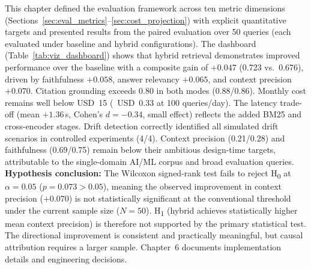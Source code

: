 \medskip
\noindent This chapter defined the evaluation framework across ten metric dimensions (Sections~\ref{sec:eval_metrics}--\ref{sec:cost_projection}) with explicit quantitative targets and presented results from the paired evaluation over 50 queries (each evaluated under baseline and hybrid configurations). The dashboard (Table~\ref{tab:viz_dashboard}) shows that hybrid retrieval demonstrates improved performance over the baseline with a composite gain of $+0.047$ (0.723 vs.\ 0.676), driven by faithfulness $+0.058$, answer relevancy $+0.065$, and context precision $+0.070$. Citation grounding exceeds 0.80 in both modes (0.88/0.86). Monthly cost remains well below USD~15 (~USD~0.33 at 100 queries/day). The latency trade-off (mean $+1.36$\,s, Cohen's $d = -0.34$, small effect) reflects the added BM25 and cross-encoder stages. Drift detection correctly identified all simulated drift scenarios in controlled experiments (4/4). Context precision (0.21/0.28) and faithfulness (0.69/0.75) remain below their ambitious design-time targets, attributable to the single-domain AI/ML corpus and broad evaluation queries. \textbf{Hypothesis conclusion:} The Wilcoxon signed-rank test fails to reject H\textsubscript{0} at $\alpha = 0.05$ ($p = 0.073 > 0.05$), meaning the observed improvement in context precision ($+0.070$) is not statistically significant at the conventional threshold under the current sample size ($N = 50$). H\textsubscript{1} (hybrid achieves statistically higher mean context precision) is therefore not supported by the primary statistical test. The directional improvement is consistent and practically meaningful, but causal attribution requires a larger sample. Chapter~6 documents implementation details and engineering decisions.


